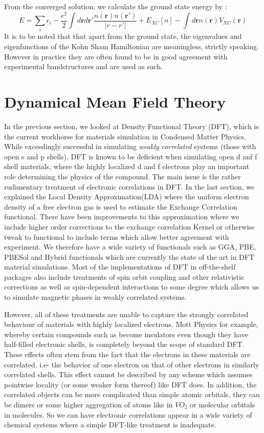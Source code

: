 \documentclass[12pt,letter]{article}
\newcommand{\rmb}{\mathbf{r}}
\begin{document}
From the converged solution, we calculate the ground state energy by :
\begin{equation}
E=\sum_i \epsilon_i - \dfrac{e^2}{2}\int d\rmb d\rmb' \dfrac{n(\rmb) n(\rmb')}{|r-r'|} +E_{XC}[n] -\int d \rmb n(\rmb) V_{XC}(\rmb)
\end{equation}
It is to be noted that that apart from the ground state, the eigenvalues and eigenfunctions of the Kohn Sham Hamiltonian are meaningless, strictly speaking. However in practice they are often found to be in good agreement with experimental bandstructures and are used as such.

\pagebreak
\section{Dynamical Mean Field Theory}





In the previous section, we looked at Density Functional Theory (DFT), which is the current workhorse for materials simulation in Condensed Matter Physics. While exceedingly successful in simulating \textit{weakly correlated} systems (those with open s and p shells), DFT is known to be deficient when simulating open d anf f shell materials, where the highly localized d and f electrons play an important role determining the physics of the compound. The main issue is the rather rudimentary treatment of electronic correlations in DFT. In the last section, we explained the Local Density Approximation(LDA) where the uniform electron density of a free electron gas is used to estimate the Exchange Correlation functional. There have been improvements to this approximation where we include higher order corrections to the exchange correlation Kernel or otherwise tweak to functional to include terms which allow better agreement with experiment. We therefore have a wide variety of functionals such as GGA, PBE, PBESol and Hybrid functionals which are currently the state of the art in DFT material simulations. Most of the implementations of DFT in off-the-shelf packages also include treatments of spin orbit coupling and other relativistic corrections as well as spin-dependent interactions to some degree which allows us to simulate magnetic phases in weakly correlated systems.

However, all of these treatments are unable to capture the strongly correlated behaviour of materials with highly localized electrons. Mott Physics for example, whereby certain compounds such as become insulators even though they have half-filled electronic shells, is completely beyond the scope of standard DFT. These effects often stem from the fact that the electrons in these materials are correlated, i.e- the behavior of one electron on that of other electrons in similarly correlated shells. This effect cannot be described by any scheme which assumes pointwise locality (or some weaker form thereof) like DFT does. In addition, the correlated objects can be more complicated than simple atomic orbitals, they can be dimers or some higher aggregation of atoms like in $VO_2$ or molecular orbitals in molecules. So we can have electronic correlations appear in a wide variety of chemical systems where a simple DFT-like treatment is inadequate.
\end{document}
